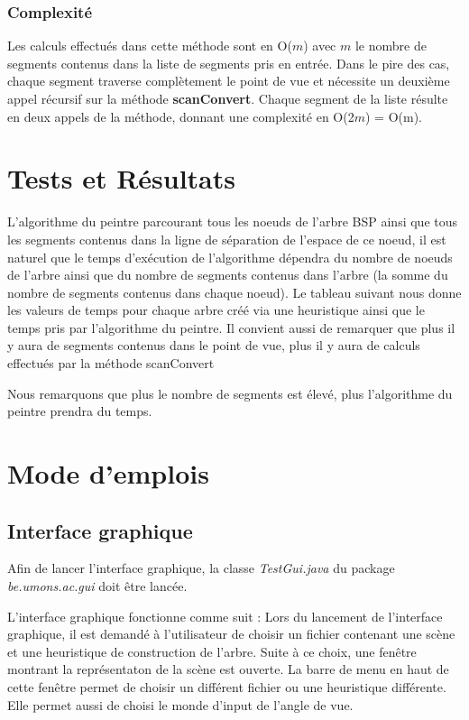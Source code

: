 \documentclass[11pt,a4paper]{article}
\theoremstyle{definition}
\theoremstyle{remark}
\begin{document}
\subsubsection{Complexité}
Les calculs effectués dans cette méthode sont en O($m$) avec $m$ le nombre de segments contenus dans la liste de segments pris en entrée. Dans le pire des cas, chaque segment traverse complètement le point de vue et nécessite un deuxième appel récursif sur la méthode \textbf{scanConvert}. Chaque segment de la liste résulte en deux appels de la méthode, donnant une complexité en O(2$m$) = O(m).

\section{Tests et Résultats}
L'algorithme du peintre parcourant tous les noeuds de l'arbre BSP ainsi que tous les segments contenus dans la ligne de séparation de l'espace de ce noeud, il est naturel que le temps d'exécution de l'algorithme dépendra du nombre de noeuds de l'arbre ainsi que du nombre de segments contenus dans l'arbre (la somme du nombre de segments contenus dans chaque noeud). Le tableau suivant nous donne les valeurs de temps pour chaque arbre créé via une heuristique ainsi que le temps pris par l'algorithme du peintre. Il convient aussi de remarquer que plus il y aura de segments contenus dans le point de vue, plus il y aura de calculs effectués par la méthode scanConvert

Nous remarquons que plus le nombre de segments est élevé, plus l'algorithme du peintre prendra du temps.

\section{Mode d'emplois}

\subsection{Interface graphique}

Afin de lancer l'interface graphique, la classe \textit{TestGui.java} du package \textit{be.umons.ac.gui} doit être lancée. 

L'interface graphique fonctionne comme suit :
Lors du lancement de l'interface graphique, il est demandé à l'utilisateur de choisir un fichier contenant une scène et une heuristique de construction de l'arbre. Suite à ce choix, une fenêtre montrant la représentaton de la scène est ouverte. La barre de menu en haut de cette fenêtre permet de choisir un différent fichier ou une heuristique différente. Elle permet aussi de choisi le monde d'input de l'angle de vue.
\end{document}

